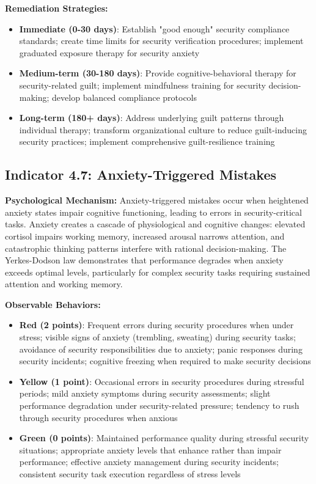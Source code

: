 \documentclass[11pt,a4paper]{article}
\begin{document}
\textbf{Remediation Strategies:}
\begin{itemize}
\item \textbf{Immediate (0-30 days)}: Establish "good enough" security compliance standards; create time limits for security verification procedures; implement graduated exposure therapy for security anxiety
\item \textbf{Medium-term (30-180 days)}: Provide cognitive-behavioral therapy for security-related guilt; implement mindfulness training for security decision-making; develop balanced compliance protocols
\item \textbf{Long-term (180+ days)}: Address underlying guilt patterns through individual therapy; transform organizational culture to reduce guilt-inducing security practices; implement comprehensive guilt-resilience training
\end{itemize}

\subsection{Indicator 4.7: Anxiety-Triggered Mistakes}

\textbf{Psychological Mechanism:}
Anxiety-triggered mistakes occur when heightened anxiety states impair cognitive functioning, leading to errors in security-critical tasks. Anxiety creates a cascade of physiological and cognitive changes: elevated cortisol impairs working memory, increased arousal narrows attention, and catastrophic thinking patterns interfere with rational decision-making\cite{eysenck1992}. The Yerkes-Dodson law demonstrates that performance degrades when anxiety exceeds optimal levels, particularly for complex security tasks requiring sustained attention and working memory.

\textbf{Observable Behaviors:}
\begin{itemize}
\item \textbf{Red (2 points)}: Frequent errors during security procedures when under stress; visible signs of anxiety (trembling, sweating) during security tasks; avoidance of security responsibilities due to anxiety; panic responses during security incidents; cognitive freezing when required to make security decisions
\item \textbf{Yellow (1 point)}: Occasional errors in security procedures during stressful periods; mild anxiety symptoms during security assessments; slight performance degradation under security-related pressure; tendency to rush through security procedures when anxious
\item \textbf{Green (0 points)}: Maintained performance quality during stressful security situations; appropriate anxiety levels that enhance rather than impair performance; effective anxiety management during security incidents; consistent security task execution regardless of stress levels
\end{itemize}
\end{document}
